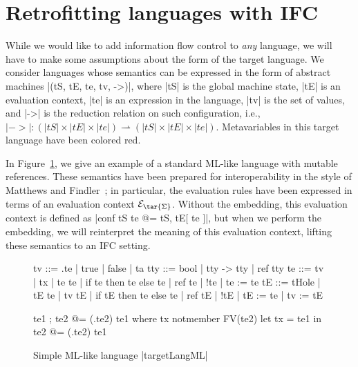 \section{Retrofitting languages with IFC}
\label{sec:retrofit}

While we would like to add information flow control to \emph{any}
language, we will have to make some assumptions about the form of the
target language.  We consider languages whose semantics can be expressed
in the form of abstract machines |(tS, tE, te, tv, ->)|, where |tS| is the
global machine state, |tE| is an evaluation context, |te| is an
expression in the language, |tv| is the set of values, and |->| is the reduction relation on such
configuration, i.e., $|->| : (|tS| \times |tE| \times |te|)
\rightharpoonup (|tS| \times |tE| \times |te|)$.  Metavariables in this
target language have been colored red.

In Figure~\ref{fig:ml}, we give an example of a standard ML-like
language with mutable references.  These semantics have been prepared
for interoperability in the style of Matthews and Findler~; in
particular, the evaluation rules have been expressed in terms of an
evaluation context $\mathcal{E}_{\tar{\Sigma}}$.  Without the embedding,
this evaluation context is defined as |conf tS te @= tS, tE[ te ]|, but
when we perform the embedding, we will reinterpret the meaning
of this evaluation context, lifting these semantics to an IFC setting.

\begin{figure}
\begin{code}
tv   ::= \tx.te | true | false | ta
tty   ::= bool | tty -> tty | ref tty
te   ::= tv | tx | te te | if te then te else te | ref te | !te | te := te
tE   ::= tHole | tE te | tv tE | if tE then te else te
       | ref tE | !tE | tE := te | tv := tE 

te1 ; te2            @= (\tx.te2) te1  where  tx notmember FV(te2)
let tx = te1 in te2  @= (\tx.te2) te1
\end{code}



\caption{Simple ML-like language |targetLangML|}
\label{fig:ml}
\end{figure}


